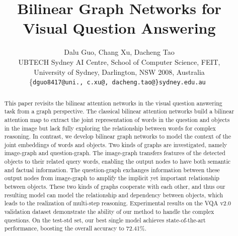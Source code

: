 \documentclass[10pt,twocolumn,letterpaper]{article}
\begin{document}
\title{Bilinear Graph Networks for Visual Question Answering}

\author{Dalu Guo, Chang Xu, Dacheng Tao\\
	UBTECH Sydney AI Centre, School of Computer Science, FEIT, 
	\\University of Sydney, Darlington, NSW 2008, Australia\\
	\{\tt\small dguo8417@uni., c.xu@, dacheng.tao@\}sydney.edu.au
}

\maketitle



\begin{abstract}
This paper revisits the bilinear attention networks in the visual question answering task from a graph perspective. The classical bilinear attention networks build a bilinear attention map to extract the joint representation of words in the question and objects in the image but lack fully exploring the relationship between words for complex reasoning. In contrast, we develop bilinear graph networks to model the context of the joint embeddings of words and objects. Two kinds of graphs are investigated, namely image-graph and question-graph. The image-graph transfers features of the detected objects to their related query words, enabling the output nodes to have both semantic and factual information. The question-graph exchanges information between these output nodes from image-graph to amplify the implicit yet important relationship between objects. These two kinds of graphs cooperate with each other, and thus our resulting model can model the relationship and dependency between objects, which leads to the realization of multi-step reasoning. Experimental results on the VQA v2.0 validation dataset demonstrate the ability of our method to handle the complex questions. On the test-std set, our best single model achieves state-of-the-art performance, boosting the overall accuracy to 72.41\%. 
\end{abstract}
\vspace{-10pt}
\end{document}

